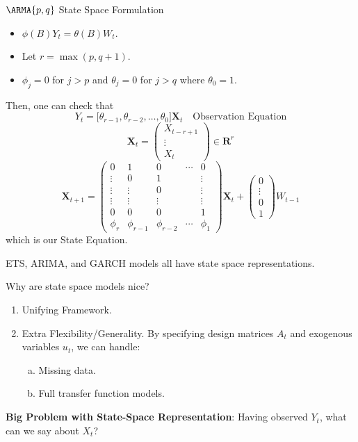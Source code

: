 \begin{Example}{$ \ARMA{p,q} $ State Space Formulation}{}
    \begin{itemize}
        \item $ \phi(B)Y_t=\theta(B)W_t $.
        \item Let $ r=\max(p,q+1) $.
        \item $ \phi_j=0 $ for $ j>p $ and $ \theta_j=0 $ for $ j>q $ where $ \theta_0=1 $.
    \end{itemize}
    Then, one can check that
    \[ Y_t=\bigl[\theta_{r-1},\theta_{r-2},\ldots,\theta_0\bigr]\symbf{X}_t\quad\text{Observation Equation} \]
    \[ \symbf{X}_t=\begin{pmatrix}
            X_{t-r+1} \\
            \vdots    \\
            X_t
        \end{pmatrix}\in\mathbf{R}^r \]
    \[ \symbf{X}_{t+1}=\begin{pmatrix}
            0      & 1          & 0          & \cdots & 0      \\
            \vdots & 0          & 1          &        & \vdots \\
            \vdots & \vdots     & 0          &        & \vdots \\
            \vdots & \vdots     & \vdots     &        & \vdots \\
            0      & 0          & 0          &        & 1      \\
            \phi_r & \phi_{r-1} & \phi_{r-2} & \cdots & \phi_1
        \end{pmatrix}\symbf{X}_t+\begin{pmatrix}
            0      \\
            \vdots \\
            0      \\
            1
        \end{pmatrix}W_{t-1} \]
    which is our State Equation.
\end{Example}
\begin{Remark}{}{}
    ETS, ARIMA, and GARCH models all have state space representations.
\end{Remark}
Why are state space models nice?
\begin{enumerate}[(1)]
    \item Unifying Framework.
    \item Extra Flexibility/Generality. By specifying design matrices $ A_t $
          and exogenous variables $ u_t $, we can handle:
          \begin{enumerate}[(a)]
              \item Missing data.
              \item Full transfer function models.
          \end{enumerate}
\end{enumerate}
\textbf{Big Problem with State-Space Representation}: Having observed $ Y_t $,
what can we say about $ X_t $?
